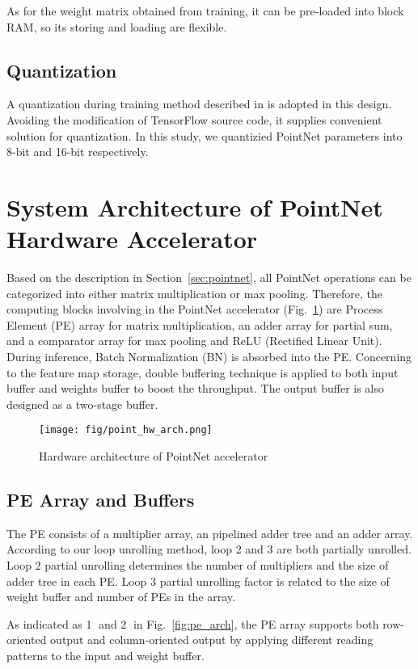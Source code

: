 \documentclass[conference]{IEEEtran}
\begin{document}
As for the weight matrix obtained from training, it can be pre-loaded into block RAM, so its storing and loading are flexible.

\subsection{Quantization}
A quantization during training method described in \cite{lyu2018chipnet} is adopted in this design. Avoiding the modification of TensorFlow source code, it supplies convenient solution for quantization. In this study, we quantizied PointNet parameters into 8-bit and 16-bit respectively.

\section{System Architecture of PointNet Hardware Accelerator}\label{sec:hw_arch}
Based on the description in Section~\ref{sec:pointnet}, all PointNet operations can be categorized into either matrix multiplication or max pooling. Therefore, the computing blocks involving in the PointNet accelerator (Fig.~\ref{fig:point_hw_arch}) are Process Element (PE) array for matrix multiplication, an adder array for partial sum, and a comparator array for max pooling and ReLU (Rectified Linear Unit). During inference, Batch Normalization (BN) is absorbed into the PE. Concerning to the feature map storage, double buffering technique is applied to both input buffer and weights buffer to boost the throughput. The output buffer is also designed as a two-stage buffer.

\begin{figure}[htbp]
    \centering
    \texttt{[image: fig/point\_hw\_arch.png]}
    \caption{Hardware architecture of PointNet accelerator}
    \label{fig:point_hw_arch}
\end{figure}

\subsection{PE Array and Buffers}
The PE consists of a multiplier array, an pipelined adder tree and an adder array. According to our loop unrolling method, loop 2 and 3 are both partially unrolled. Loop 2 partial unrolling determines the number of multipliers and the size of adder tree in each PE. Loop 3 partial unrolling factor is related to the size of weight buffer and number of PEs in the array.

As indicated as \textcircled{1} and \textcircled{2} in Fig.~\ref{fig:pe_arch}, the PE array supports both row-oriented output and column-oriented output by applying different reading patterns to the input and weight buffer.
\end{document}

